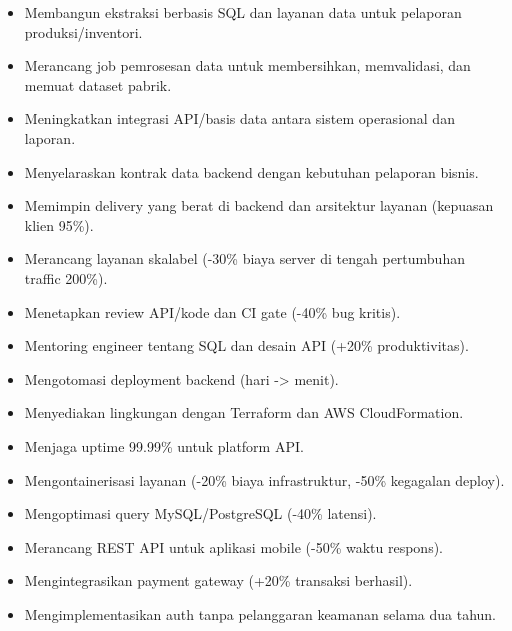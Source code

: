 \begin{itemize}
  \item Membangun ekstraksi berbasis SQL dan layanan data untuk pelaporan produksi/inventori.
  \item Merancang job pemrosesan data untuk membersihkan, memvalidasi, dan memuat dataset pabrik.
  \item Meningkatkan integrasi API/basis data antara sistem operasional dan laporan.
  \item Menyelaraskan kontrak data backend dengan kebutuhan pelaporan bisnis.
\end{itemize}
\vspace{4pt}
\begin{itemize}
  \item Memimpin delivery yang berat di backend dan arsitektur layanan (kepuasan klien 95\%).
  \item Merancang layanan skalabel (-30\% biaya server di tengah pertumbuhan traffic 200\%).
  \item Menetapkan review API/kode dan CI gate (-40\% bug kritis).
  \item Mentoring engineer tentang SQL dan desain API (+20\% produktivitas).
\end{itemize}
\vspace{4pt}
\begin{itemize}
  \item Mengotomasi deployment backend (hari -> menit).
  \item Menyediakan lingkungan dengan Terraform dan AWS CloudFormation.
  \item Menjaga uptime 99.99\% untuk platform API.
  \item Mengontainerisasi layanan (-20\% biaya infrastruktur, -50\% kegagalan deploy).
\end{itemize}
\vspace{4pt}
\begin{itemize}
  \item Mengoptimasi query MySQL/PostgreSQL (-40\% latensi).
  \item Merancang REST API untuk aplikasi mobile (-50\% waktu respons).
  \item Mengintegrasikan payment gateway (+20\% transaksi berhasil).
  \item Mengimplementasikan auth tanpa pelanggaran keamanan selama dua tahun.
\end{itemize}
